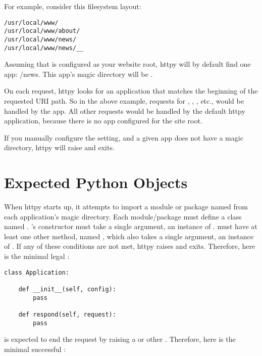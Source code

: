For example, consider this filesystem layout:

\begin{verbatim}
/usr/local/www/
/usr/local/www/about/
/usr/local/www/news/
/usr/local/www/news/__
\end{verbatim}

Assuming that  is configured as your website root, httpy
will by default find one app: /news. This app's magic directory will be
.

On each request, httpy looks for an application that matches the beginning of
the requested URI path. So in the above example, requests for ,
, , etc., would be handled by the
 app. All other requests would be handled by the default httpy
application, because there is no app configured for the site root.

If you manually configure the  setting, and a given app does not have
a magic directory, httpy will raise  and exits.



\section{Expected Python Objects}

When httpy starts up, it attempts to import a module or package named
 from each application's magic directory. Each 
module/package must define a class named .
's constructor must take a single argument, an instance of
.  must have at least one other method,
named , which also takes a single argument, an instance of
. If any of these conditions are not met, httpy raises
 and exits. Therefore, here is the minimal legal
:

\begin{verbatim}
class Application:

    def __init__(self, config):
        pass

    def respond(self, request):
        pass

\end{verbatim}

 is expected to end the request by raising a
 or other . Therefore, here is the minimal
successful :

